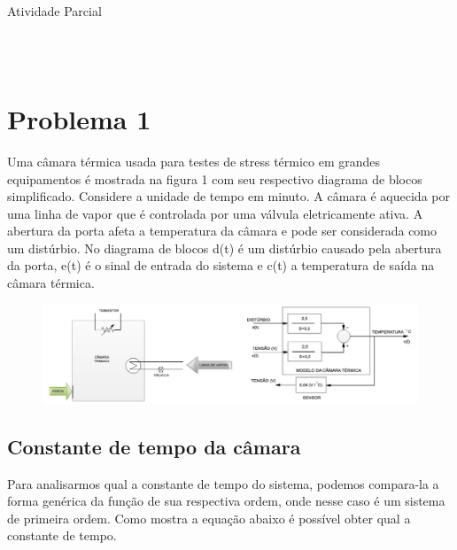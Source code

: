 \documentclass[a4paper,12pt]{article}
\begin{document}
	\begin{center}
		\begin{Huge}
			Atividade Parcial
		\end{Huge}
	\end{center}

	\begin{center}
		\\
		\\
		
		
		
	\end{center}
	
	\paragraph{}
	
	\section{Problema 1}
	Uma câmara térmica usada para testes de stress térmico em grandes equipamentos é mostrada na figura 1 com seu respectivo diagrama de blocos simplificado. Considere a unidade de tempo em minuto. A câmara é aquecida por uma linha de vapor que é controlada por uma válvula eletricamente ativa. A abertura da porta afeta a temperatura da câmara e pode ser considerada como um distúrbio. No diagrama de blocos d(t) é um distúrbio causado pela abertura da porta, e(t) é o sinal de entrada do sistema e c(t) a temperatura de saída na câmara térmica.
	

	\begin{figure}[H]
		\centering
		\includegraphics[width=0.9\linewidth]{images/planta_problema1}
		\label{fig:plantaproblema1}
	\end{figure}

	\subsection{Constante de tempo da câmara}
		Para analisarmos qual a constante de tempo do sistema, podemos compara-la a forma genérica da função de sua respectiva ordem, onde nesse caso é um sistema de primeira ordem. Como mostra a equação abaixo é possível obter qual a constante de tempo.
	
\end{document}
